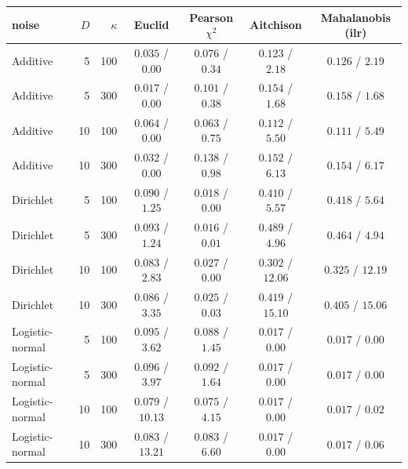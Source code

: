 \begin{tabular}{lrrcccc}\toprule
noise & $D$ & $\kappa$ & Euclid & Pearson $\chi^2$ & Aitchison & Mahalanobis (ilr)\\\midrule
Additive & 5 & 100 & $0.035$ / $0.00$ & $0.076$ / $0.34$ & $0.123$ / $2.18$ & $0.126$ / $2.19$\\
Additive & 5 & 300 & $0.017$ / $0.00$ & $0.101$ / $0.38$ & $0.154$ / $1.68$ & $0.158$ / $1.68$\\
Additive & 10 & 100 & $0.064$ / $0.00$ & $0.063$ / $0.75$ & $0.112$ / $5.50$ & $0.111$ / $5.49$\\
Additive & 10 & 300 & $0.032$ / $0.00$ & $0.138$ / $0.98$ & $0.152$ / $6.13$ & $0.154$ / $6.17$\\
Dirichlet & 5 & 100 & $0.090$ / $1.25$ & $0.018$ / $0.00$ & $0.410$ / $5.57$ & $0.418$ / $5.64$\\
Dirichlet & 5 & 300 & $0.093$ / $1.24$ & $0.016$ / $0.01$ & $0.489$ / $4.96$ & $0.464$ / $4.94$\\
Dirichlet & 10 & 100 & $0.083$ / $2.83$ & $0.027$ / $0.00$ & $0.302$ / $12.06$ & $0.325$ / $12.19$\\
Dirichlet & 10 & 300 & $0.086$ / $3.35$ & $0.025$ / $0.03$ & $0.419$ / $15.10$ & $0.405$ / $15.06$\\
Logistic-normal & 5 & 100 & $0.095$ / $3.62$ & $0.088$ / $1.45$ & $0.017$ / $0.00$ & $0.017$ / $0.00$\\
Logistic-normal & 5 & 300 & $0.096$ / $3.97$ & $0.092$ / $1.64$ & $0.017$ / $0.00$ & $0.017$ / $0.00$\\
Logistic-normal & 10 & 100 & $0.079$ / $10.13$ & $0.075$ / $4.15$ & $0.017$ / $0.00$ & $0.017$ / $0.02$\\
Logistic-normal & 10 & 300 & $0.083$ / $13.21$ & $0.083$ / $6.60$ & $0.017$ / $0.00$ & $0.017$ / $0.06$\\
\bottomrule\end{tabular}
